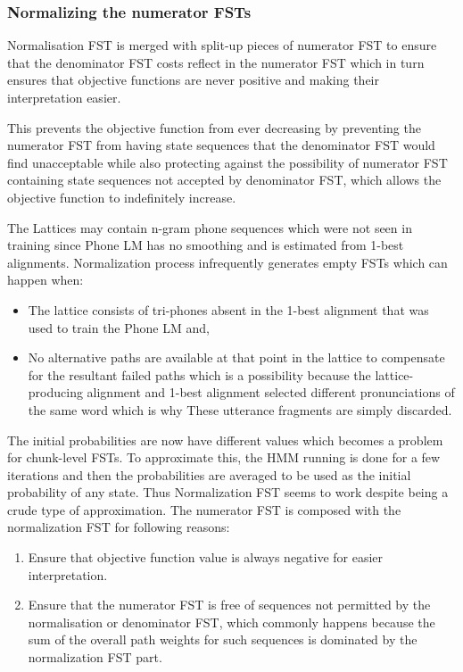 \subsubsection{Normalizing the numerator FSTs} 
Normalisation FST is merged with split-up pieces of numerator FST to ensure that the denominator FST costs reflect in the numerator FST which in turn ensures that objective functions are never positive and making their interpretation easier. 

This prevents the objective function from ever decreasing by preventing the numerator FST from having state sequences that the denominator FST would find unacceptable while also protecting against the possibility of numerator FST containing state sequences not accepted by denominator FST, which allows the objective function to indefinitely increase. 

The Lattices may contain n-gram phone sequences which were not seen in training since Phone LM has no smoothing and is estimated from 1-best alignments. Normalization process infrequently generates empty FSTs which can happen when: 
        \begin{itemize}
            \item The lattice consists of tri-phones absent in the 1-best alignment that was used to train the Phone LM and, 
            \item No alternative paths are available at that point in the lattice to compensate for the resultant failed paths which is a possibility because the lattice-producing alignment and 1-best alignment selected different pronunciations of the same word which is why These utterance fragments are simply discarded.
        \end{itemize}

The initial probabilities are now have different values which becomes a problem for chunk-level FSTs. To approximate this, the HMM running is done for a few iterations and then the probabilities are averaged to be used as the initial probability of any state. Thus Normalization FST seems to work despite being a crude type of approximation. The numerator FST is composed with the normalization FST for following reasons: 
       \begin{enumerate}
            \item Ensure that objective function value is always negative for easier interpretation. 
            \item Ensure that the numerator FST is free of sequences not permitted by the normalisation or denominator FST, which commonly happens because the sum of the overall path weights for such sequences is dominated by the normalization FST part. %
        \end{enumerate}

